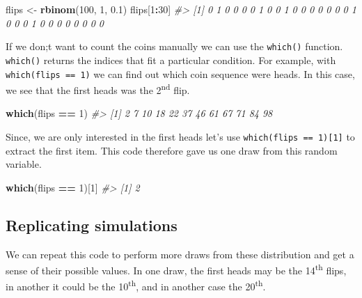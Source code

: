 \documentclass[]{article}
\newenvironment{Shaded}{\begin{snugshade}}{\end{snugshade}}
\newcommand{\CommentTok}[1]{\textcolor[rgb]{0.56,0.35,0.01}{\textit{#1}}}
\newcommand{\DecValTok}[1]{\textcolor[rgb]{0.00,0.00,0.81}{#1}}
\newcommand{\FloatTok}[1]{\textcolor[rgb]{0.00,0.00,0.81}{#1}}
\newcommand{\KeywordTok}[1]{\textcolor[rgb]{0.13,0.29,0.53}{\textbf{#1}}}
\newcommand{\NormalTok}[1]{#1}
\newcommand{\OperatorTok}[1]{\textcolor[rgb]{0.81,0.36,0.00}{\textbf{#1}}}
\newcommand{\StringTok}[1]{\textcolor[rgb]{0.31,0.60,0.02}{#1}}
\begin{document}
\begin{Shaded}
\begin{Highlighting}[]
\NormalTok{flips <-}\StringTok{ }\KeywordTok{rbinom}\NormalTok{(}\DecValTok{100}\NormalTok{, }\DecValTok{1}\NormalTok{, }\FloatTok{0.1}\NormalTok{)}
\NormalTok{flips[}\DecValTok{1}\OperatorTok{:}\DecValTok{30}\NormalTok{]}
\CommentTok{#>  [1] 0 1 0 0 0 0 1 0 0 1 0 0 0 0 0 0 0 1 0 0 0 1 0 0 0 0 0 0 0 0}
\end{Highlighting}
\end{Shaded}

If we don;t want to count the coins manually we can use the
\texttt{which()} function. \texttt{which()} returns the indices that fit
a particular condition. For example, with \texttt{which(flips\ ==\ 1)}
we can find out which coin sequence were heads. In this case, we see
that the first heads was the 2\textsuperscript{nd} flip.

\begin{Shaded}
\begin{Highlighting}[]
\KeywordTok{which}\NormalTok{(flips }\OperatorTok{==}\StringTok{ }\DecValTok{1}\NormalTok{)}
\CommentTok{#>  [1]  2  7 10 18 22 37 46 61 67 71 84 98}
\end{Highlighting}
\end{Shaded}

Since, we are only interested in the first heads let's use
\texttt{which(flips\ ==\ 1){[}1{]}} to extract the first item. This code
therefore gave us one draw from this random variable.

\begin{Shaded}
\begin{Highlighting}[]
\KeywordTok{which}\NormalTok{(flips }\OperatorTok{==}\StringTok{ }\DecValTok{1}\NormalTok{)[}\DecValTok{1}\NormalTok{]}
\CommentTok{#> [1] 2}
\end{Highlighting}
\end{Shaded}

\hypertarget{replicating-simulations}{%
\subsection{Replicating simulations}\label{replicating-simulations}}

We can repeat this code to perform more draws from these distribution
and get a sense of their possible values. In one draw, the first heads
may be the 14\textsuperscript{th} flips, in another it could be the
10\textsuperscript{th}, and in another case the 20\textsuperscript{th}.
\end{document}
